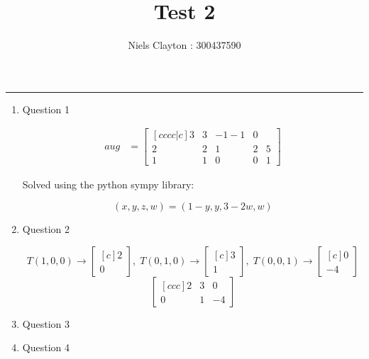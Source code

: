 \documentclass[a4paper,11pt]{article}
\title{\LARGE{\textbf{Test 2}}}
\author{Niels Clayton : 300437590}
\date{}
\begin{document}
\begin{preview}
    \maketitle
    \hrule

    
    \begin{enumerate}
        \item Question 1

        \begin{align*}
            aug &=
            \begin{bmatrix}[cccc|c]
                3&3&-1-1&0\\ 
                2&2&1&2&5\\ 
                1&1&0&0&1
            \end{bmatrix}
        \end{align*}

        Solved using the python sympy library:


        $$ (x,y,z,w) = (1-y, y, 3-2w, w) $$


        \item Question 2

        $$
            T(1,0,0) \rightarrow \begin{bmatrix}[c] 2\\0\end{bmatrix}, \; 
            T(0,1,0) \rightarrow \begin{bmatrix}[c] 3\\1 \end{bmatrix}, \;
            T(0,0,1) \rightarrow \begin{bmatrix}[c] 0\\-4 \end{bmatrix}
        $$
        $$ \begin{bmatrix}[ccc] 2&3&0 \\ 0&1&-4  \end{bmatrix} $$

        \item Question 3

        \item Question 4


\end{enumerate}
\end{preview}
\end{document}
